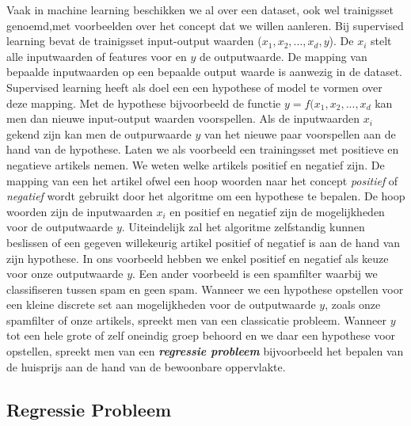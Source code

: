 Vaak in machine learning beschikken we al over een dataset, ook wel trainigsset genoemd,met voorbeelden over het concept dat we willen aanleren. Bij supervised learning bevat de trainigsset input-output waarden ($x_{1},x_{2},...,x_{d},y$). De $x_{i}$ stelt alle inputwaarden of features voor en $y$ de outputwaarde. De mapping van bepaalde inputwaarden op een bepaalde output waarde is aanwezig in de dataset. Supervised learning heeft als doel een  een hypothese of model te vormen over deze mapping. Met de hypothese bijvoorbeeld de functie $y=f(x_{1},x_{2},...,x_{d}$ kan men dan nieuwe input-output waarden voorspellen. Als de inputwaarden $x_{i}$ gekend zijn kan men de outpurwaarde $y$ van het nieuwe paar voorspellen aan de hand van de hypothese.  
\newline
Laten we als voorbeeld een trainingsset met positieve en negatieve artikels nemen. We weten welke artikels positief en negatief zijn. De mapping van een het artikel ofwel een hoop woorden naar het concept \textit{positief} of \textit{negatief} wordt gebruikt door het algoritme om een hypothese te bepalen. De hoop woorden zijn de inputwaarden $x_{i}$ en positief en negatief zijn de mogelijkheden voor de outputwaarde $y$. Uiteindelijk zal het algoritme zelfstandig kunnen beslissen of een gegeven willekeurig artikel positief of negatief is aan de hand van zijn hypothese.
\newline
In ons voorbeeld hebben we enkel positief en negatief als keuze voor onze outputwaarde $y$. Een ander voorbeeld is een spamfilter waarbij we classifiseren tussen spam en geen spam. Wanneer we een hypothese opstellen voor een kleine discrete set aan mogelijkheden voor de outputwaarde $y$, zoals onze spamfilter of onze artikels, spreekt men van een classicatie probleem. Wanneer $y$ tot een hele grote of zelf oneindig groep behoord en we daar een hypothese voor opstellen, spreekt men van een \textbf{\textit{regressie probleem}} bijvoorbeeld het bepalen van de huisprijs aan de hand van de bewoonbare oppervlakte.

\subsection{Regressie Probleem}\label{Regressie Probleem}

